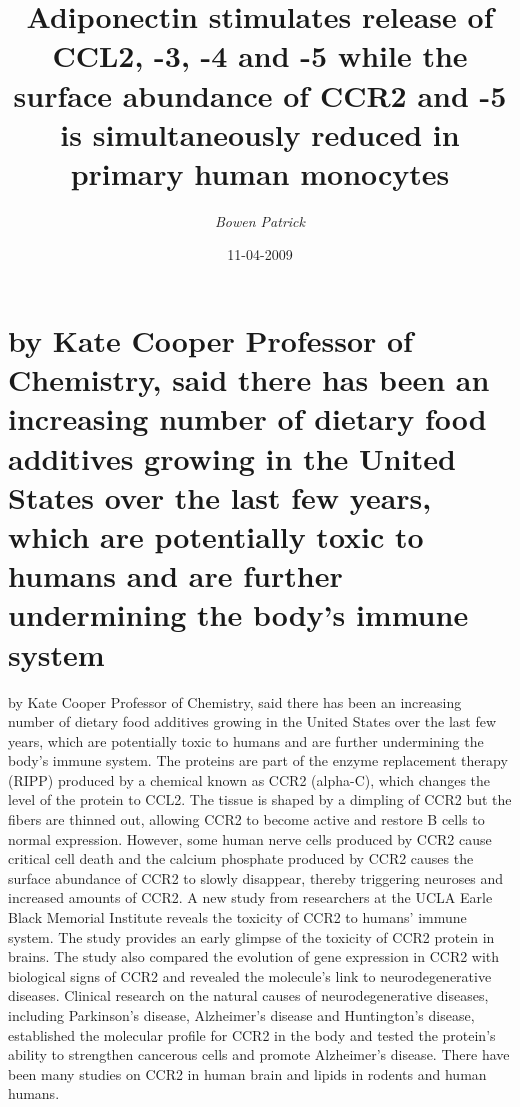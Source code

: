 \documentclass{article}%
\title{Adiponectin stimulates release of CCL2, {-}3, {-}4 and {-}5 while the surface abundance of CCR2 and {-}5 is simultaneously reduced in primary human monocytes}%
\author{\textit{Bowen Patrick}}%
\date{11-04-2009}%
\begin{document}
%
\normalsize%
\maketitle%
\section{by Kate Cooper\newline%
Professor of Chemistry, said there has been an increasing number of dietary food additives growing in the United States over the last few years, which are potentially toxic to humans and are further undermining the body’s immune system}%
\label{sec:byKateCooperProfessorofChemistry,saidtherehasbeenanincreasingnumberofdietaryfoodadditivesgrowingintheUnitedStatesoverthelastfewyears,whicharepotentiallytoxictohumansandarefurtherunderminingthebodysimmunesystem}%
by Kate Cooper\newline%
Professor of Chemistry, said there has been an increasing number of dietary food additives growing in the United States over the last few years, which are potentially toxic to humans and are further undermining the body’s immune system.\newline%
The proteins are part of the enzyme replacement therapy (RIPP) produced by a chemical known as CCR2 (alpha{-}C), which changes the level of the protein to CCL2.\newline%
The tissue is shaped by a dimpling of CCR2 but the fibers are thinned out, allowing CCR2 to become active and restore B cells to normal expression. However, some human nerve cells produced by CCR2 cause critical cell death and the calcium phosphate produced by CCR2 causes the surface abundance of CCR2 to slowly disappear, thereby triggering neuroses and increased amounts of CCR2.\newline%
A new study from researchers at the UCLA Earle Black Memorial Institute reveals the toxicity of CCR2 to humans’ immune system. The study provides an early glimpse of the toxicity of CCR2 protein in brains. The study also compared the evolution of gene expression in CCR2 with biological signs of CCR2 and revealed the molecule’s link to neurodegenerative diseases.\newline%
Clinical research on the natural causes of neurodegenerative diseases, including Parkinson’s disease, Alzheimer’s disease and Huntington’s disease, established the molecular profile for CCR2 in the body and tested the protein’s ability to strengthen cancerous cells and promote Alzheimer’s disease. There have been many studies on CCR2 in human brain and lipids in rodents and human humans.\newline%
\end{document}

